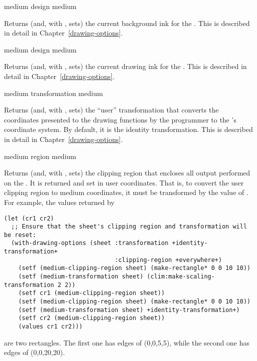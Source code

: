  {medium}
 {design medium}

Returns (and, with , sets) the current background ink for the
 .  This is described in detail in
Chapter~\ref{drawing-options}.


 {medium}
 {design medium}

Returns (and, with , sets) the current drawing ink for the
 .  This is described in detail in
Chapter~\ref{drawing-options}.


 {medium}
 {transformation medium}

Returns (and, with , sets) the ``user'' transformation that converts
the coordinates presented to the drawing functions by the programmer to the
 's coordinate system. By default, it is the identity
transformation.  This is described in detail in Chapter~\ref{drawing-options}.


 {medium}
 {region medium}

Returns (and, with , sets) the clipping region that encloses all output
performed on the  .  It is returned and set in user
coordinates.  That is, to convert the user clipping region to medium
coordinates, it must be transformed by the value of .
For example, the values returned by

\begin{verbatim}
(let (cr1 cr2)
  ;; Ensure that the sheet's clipping region and transformation will be reset:
  (with-drawing-options (sheet :transformation +identity-transformation+
                               :clipping-region +everywhere+)
    (setf (medium-clipping-region sheet) (make-rectangle* 0 0 10 10))
    (setf (medium-transformation sheet) (clim:make-scaling-transformation 2 2))
    (setf cr1 (medium-clipping-region sheet))
    (setf (medium-clipping-region sheet) (make-rectangle* 0 0 10 10))
    (setf (medium-transformation sheet) +identity-transformation+)
    (setf cr2 (medium-clipping-region sheet))
    (values cr1 cr2)))
\end{verbatim}

are two rectangles.  The first one has edges of (0,0,5,5), while the second one
has edges of (0,0,20,20).

